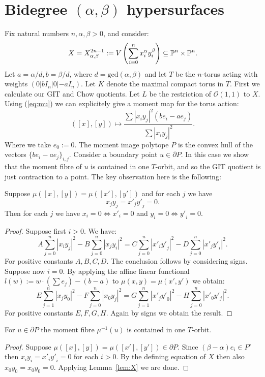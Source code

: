 \section{Bidegree $(\alpha,\beta)$ hypersurfaces} \label{subsec:hypersurfaces}
Fix natural numbers \(n,\alpha,\beta>0\), and consider:
\[
X = X_{\alpha,\beta}^{2n-1} := V \left( \sum_{i=0}^n x_i^\alpha y_i^\beta \right) \subseteq \mathbb{P}^n \times \mathbb{P}^n.
\]
Let \(a = \alpha/d, b = \beta/d\), where \(d = \text{gcd}(\alpha,\beta)\) and let \(T\) be the \(n\)-torus acting with weights \((0|b I_n|0|-a I_n)\). Let \(K\) denote the maximal compact torus in \(T\).
First we calculate our GIT and Chow quotients. Let \(L\) be the restriction of \(  \mathcal{O}(1,1)\) to \(X\). Using (\ref{eq:mu}) we can explicitely give a moment map for the torus action:
\[
([x],[y]) \mapsto \frac{ \sum |x_iy_j|^2( b e_i - a e_j)}{\sum |x_iy_j|^2}.
\]
Where we take \(e_0 := 0\). The moment image polytope \(P\) is the convex hull of the vectors \(\{ b e_i - a e_j \}_{i,j}\). Consider a boundary point \(u \in \partial P\). In this case we show that the moment fibre of \(u\) is contained in one \(T\)-orbit, and so the GIT quotient is just contraction to a point. The key observation here is the following:
%
%
%
\begin{lemma}\label{lem:X}
Suppose \(\mu([x],[y]) = \mu([x'],[y'])\) and for each \(j\) we have
\[
x_jy_j = {x'}_j{y'}_j = 0.
\]
Then for each \(j\) we have \(x_i=0 \iff {x'}_i = 0\) and \(y_i = 0 \iff {y'}_i = 0 \).
\end{lemma}
%
%
%
\begin{proof}
Suppose first \(i>0\). We have:
\[
A \sum_{j=0}^n |x_iy_j|^2 - B\sum_{j=0}^n  |x_jy_i|^2  = C \sum_{j=0}^n  |{x'}_i{y'}_j|^2 - D \sum_{j=0}^n  |{x'}_j{y'}_i|^2.
\] 
For positive constants \(A,B,C,D\). The conclusion follows by considering signs. Suppose now \(i =0\). By applying the affine linear functional \(l(w) := w \cdot \left( \sum e_j \right) - (b-a)\) to  \(\mu(x,y) = \mu(x',y')\) we obtain:
\[
 E \sum_{j=1}^n  |x_jy_0|^2  - F \sum_{j=0}^n |x_0y_j|^2 =  G \sum_{j=1}^n  |{x'}_j{y'}_0|^2 - H \sum_{j=0}^n  |{x'_0}{y'_j}|^2.
\]
For positive constants \(E,F,G,H\). Again by signs we obtain the result.
\end{proof}
%
%
%
\begin{lemma} \label{lem:3.2}
For \(u \in \partial P\) the moment fibre \(\mu^{-1}(u)\) is contained in one \(T\)-orbit.
\end{lemma}
%
%
%
\begin{proof}
Suppose \(\mu([x],[y]) = \mu([{x'}],[{y'}]) \in \partial P\). Since \( (\beta - \alpha)e_i \in P^\circ\) then \(x_iy_i = {x'}_i{y'}_i = 0\) for each \(i>0\). By the defining equation of \(X\) then also \(x_0y_0 = x_0y_0 = 0\). Applying Lemma~\ref{lem:X} we are done.
\end{proof}
